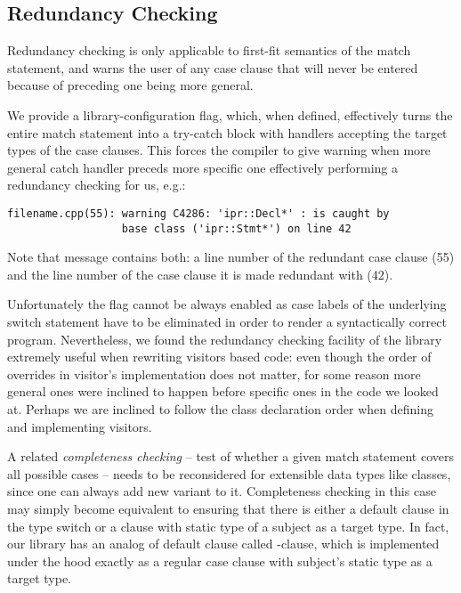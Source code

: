 \subsection{Redundancy Checking}
\label{sec:redun}

Redundancy checking is only applicable to first-fit semantics of the match 
statement, and warns the user of any case clause that will never be entered 
because of preceding one being more general.

We provide a library-configuration flag, which, when defined, effectively turns 
the entire match statement into a try-catch block with handlers accepting the 
target types of the case clauses. This forces the compiler to give warning when 
more general catch handler preceds more specific one effectively performing a 
redundancy checking for us, e.g.:

\begin{lstlisting}
filename.cpp(55): warning C4286: 'ipr::Decl*' : is caught by 
                  base class ('ipr::Stmt*') on line 42
\end{lstlisting}

\noindent
Note that message contains both: a line number of the redundant case clause (55) 
and the line number of the case clause it is made redundant with (42).

Unfortunately the flag cannot be always enabled as case labels of the underlying 
switch statement have to be eliminated in order to render a syntactically 
correct program. Nevertheless, we found the redundancy checking facility of the 
library extremely useful when rewriting visitors based code: even though the 
order of overrides in visitor's implementation does not matter, for some reason 
more general ones were inclined to happen before specific ones in the code we 
looked at. Perhaps we are inclined to follow the class declaration order when 
defining and implementing visitors.

A related \emph{completeness checking} -- test of whether a given match 
statement covers all possible cases -- needs to be reconsidered for extensible 
data types like classes, since one can always add new variant to it. 
Completeness checking in this case may simply become equivalent to ensuring that 
there is either a default clause in the type switch or a clause with static type 
of a subject as a target type. In fact, our library has an analog of default 
clause called -clause, which is implemented under the hood 
exactly as a regular case clause with subject's static type as a target type.
